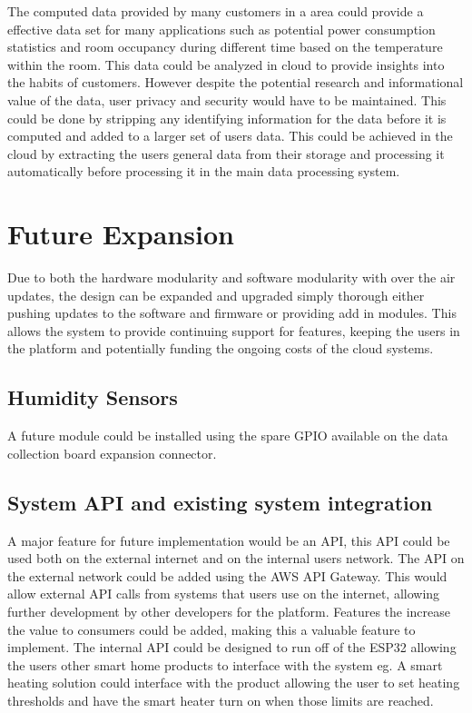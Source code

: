 \documentclass{article}
\begin{document}
The computed data provided by many customers in a area could provide a effective data set for many
applications such as potential power consumption statistics and room occupancy during different
time based on the temperature within the room. This data could be analyzed in cloud to provide
insights into the habits of customers. However despite the potential research and informational
value of the data, user privacy and security would have to be maintained. This could be done by
stripping any identifying information for the data before it is computed and added to a larger set
of users data. This could be achieved in the cloud by extracting the users general data from their
storage and processing it automatically before processing it in the main data processing system.

\section{Future Expansion}
Due to both the hardware modularity and software modularity with over the air updates, the design
can be expanded and upgraded simply thorough either pushing updates to the software and firmware
or providing add in modules. This allows the system to provide continuing support for features,
keeping the users in the platform and potentially funding the ongoing costs of the cloud systems.

\subsection{Humidity Sensors}
A future module could be installed using the spare GPIO available on the data collection board
expansion connector. 

\subsection{System API and existing system integration}
A major feature for future implementation would be an API, this API could be used both on the
external internet and on the internal users network. The API on the external network could be
added using the AWS API Gateway. This would allow external API calls from systems that users use
on the internet, allowing further development by other developers for the platform. Features the
increase the value to consumers could be added, making this a valuable feature to implement. The
internal API could be designed to run off of the ESP32 allowing the users other smart home
products to interface with the system eg. A smart heating solution could interface with the
product allowing the user to set heating thresholds and have the smart heater turn on when those
limits are reached.
\end{document}
